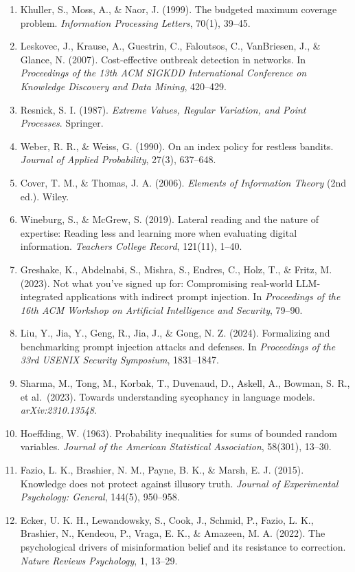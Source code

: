 \documentclass[
  chinese,
  11pt]{article}
\begin{document}
\begin{enumerate}
\item
  Khuller, S., Moss, A., \& Naor, J. (1999). The budgeted maximum coverage problem. \emph{Information Processing Letters}, 70(1), 39--45.
\item
  Leskovec, J., Krause, A., Guestrin, C., Faloutsos, C., VanBriesen, J., \& Glance, N. (2007). Cost-effective outbreak detection in networks. In \emph{Proceedings of the 13th ACM SIGKDD International Conference on Knowledge Discovery and Data Mining}, 420--429.
\item
  Resnick, S. I. (1987). \emph{Extreme Values, Regular Variation, and Point Processes}. Springer.
\item
  Weber, R. R., \& Weiss, G. (1990). On an index policy for restless bandits. \emph{Journal of Applied Probability}, 27(3), 637--648.
\item
  Cover, T. M., \& Thomas, J. A. (2006). \emph{Elements of Information Theory} (2nd ed.). Wiley.
\item
  Wineburg, S., \& McGrew, S. (2019). Lateral reading and the nature of expertise: Reading less and learning more when evaluating digital information. \emph{Teachers College Record}, 121(11), 1--40.
\item
  Greshake, K., Abdelnabi, S., Mishra, S., Endres, C., Holz, T., \& Fritz, M. (2023). Not what you've signed up for: Compromising real-world LLM-integrated applications with indirect prompt injection. In \emph{Proceedings of the 16th ACM Workshop on Artificial Intelligence and Security}, 79--90.
\item
  Liu, Y., Jia, Y., Geng, R., Jia, J., \& Gong, N. Z. (2024). Formalizing and benchmarking prompt injection attacks and defenses. In \emph{Proceedings of the 33rd USENIX Security Symposium}, 1831--1847.
\item
  Sharma, M., Tong, M., Korbak, T., Duvenaud, D., Askell, A., Bowman, S. R., et al.~(2023). Towards understanding sycophancy in language models. \emph{arXiv:2310.13548}.
\item
  Hoeffding, W. (1963). Probability inequalities for sums of bounded random variables. \emph{Journal of the American Statistical Association}, 58(301), 13--30.
\item
  Fazio, L. K., Brashier, N. M., Payne, B. K., \& Marsh, E. J. (2015). Knowledge does not protect against illusory truth. \emph{Journal of Experimental Psychology: General}, 144(5), 950--958.
\item
  Ecker, U. K. H., Lewandowsky, S., Cook, J., Schmid, P., Fazio, L. K., Brashier, N., Kendeou, P., Vraga, E. K., \& Amazeen, M. A. (2022). The psychological drivers of misinformation belief and its resistance to correction. \emph{Nature Reviews Psychology}, 1, 13--29.

\end{enumerate}
\end{document}
